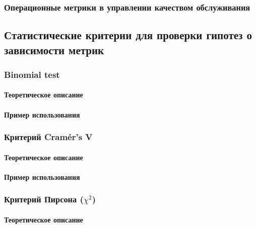 \documentclass[12pt]{article}
\begin{document}
\subsubsection{Операционные метрики в управлении качеством обслуживания}
\vspace{0.5em}

\subsection{Статистические критерии для проверки гипотез о зависимости метрик}

\subsubsection{Binomial test}
\paragraph{Теоретическое описание}
\vspace{0.5em}

\paragraph{Пример использования}
\vspace{0.5em}

\subsubsection{Критерий Cramér's V}

\paragraph{Теоретическое описание}
\vspace{0.5em}

\paragraph{Пример использования}
\vspace{0.5em}

\subsubsection{Критерий Пирсона ($\chi^2$)}

\paragraph{Теоретическое описание}
\vspace{0.5em}
\end{document}
